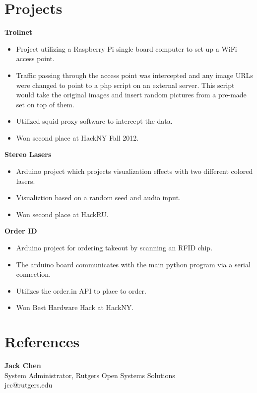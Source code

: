 \documentclass[margin]{res}
\begin{document}
\begin{resume}

\section{Projects} 

	{\bf Trollnet}
	\begin{itemize} \itemsep -2pt
		\item Project utilizing a Raspberry Pi single board computer to set up a WiFi access point.
		\item Traffic passing through the access point was intercepted and any image URLs were changed to point to a php script on an external server. This script would take the original images and insert random pictures from a pre-made set on top of them.
		\item Utilized squid proxy software to intercept the data.
		\item Won second place at HackNY Fall 2012.
	\end{itemize}

	{\bf Stereo Lasers}
	\begin{itemize} \itemsep -2pt
		\item Arduino project which projects visualization effects with two different colored lasers.
		\item Visualiztion based on a random seed and audio input.
		\item Won second place at HackRU.
	\end{itemize}

	{\bf Order ID}
	\begin{itemize} \itemsep -2pt
		\item Arduino project for ordering takeout by scanning an RFID chip.
		\item The arduino board communicates with the main python program via a serial connection.
		\item Utilizes the order.in API to place to order.
		\item Won Best Hardware Hack at HackNY.
	\end{itemize}

\section{References}
{\bf Jack Chen}\\
System Administrator, Rutgers Open Systems Solutions\\
jcc@rutgers.edu

\end{resume} 
\end{document}
